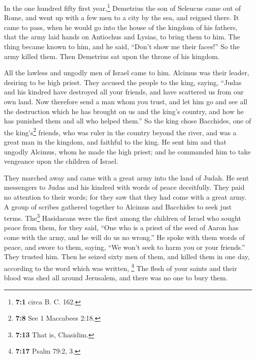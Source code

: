  In the one hundred fifty first year,\footnote{\textbf{7:1}
  circa B. C. 162.} Demetrius the son of Seleucus came out of Rome, and
went up with a few men to a city by the sea, and reigned there.
 It came to pass, when he would go into the house of the
kingdom of his fathers, that the army laid hands on Antiochus and
Lysias, to bring them to him.  The thing became known to
him, and he said, ``Don't show me their faces!''  So the
army killed them. Then Demetrius sat upon the throne of his kingdom.

 All the lawless and ungodly men of Israel came to him.
Alcimus was their leader, desiring to be high priest. 
They accused the people to the king, saying, ``Judas and his kindred
have destroyed all your friends, and have scattered us from our own
land.  Now therefore send a man whom you trust, and let
him go and see all the destruction which he has brought on us and the
king's country, and how he has punished them and all who helped them.''
 So the king chose Bacchides, one of the king's\footnote{\textbf{7:8}
  See 1 Maccabees 2:18.} friends, who was ruler in the country beyond
the river, and was a great man in the kingdom, and faithful to the king.
 He sent him and that ungodly Alcimus, whom he made the
high priest; and he commanded him to take vengeance upon the children of
Israel.

 They marched away and came with a great army into the
land of Judah. He sent messengers to Judas and his kindred with words of
peace deceitfully.  They paid no attention to their
words; for they saw that they had come with a great army.
 A group of scribes gathered together to Alcimus and
Bacchides to seek just terms.  The\footnote{\textbf{7:13}
  That is, Chasidim.} Hasidaeans were the first among the children of
Israel who sought peace from them,  for they said, ``One
who is a priest of the seed of Aaron has come with the army, and he will
do us no wrong.''  He spoke with them words of peace, and
swore to them, saying, ``We won't seek to harm you or your friends.''
 They trusted him. Then he seized sixty men of them, and
killed them in one day, according to the word which was written,
 \footnote{\textbf{7:17} Psalm 79:2, 3.} The flesh of
your saints and their blood was shed all around Jerusalem, and there was
no one to bury them.

